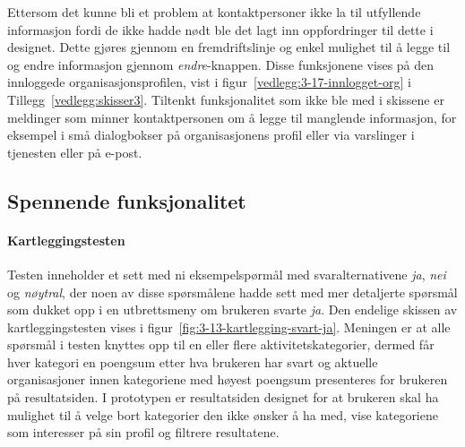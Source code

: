 Ettersom det kunne bli et problem at kontaktpersoner ikke la til utfyllende informasjon fordi de ikke hadde nødt ble det lagt inn oppfordringer til dette i designet. Dette gjøres gjennom en fremdriftslinje og enkel mulighet til å legge til og endre informasjon gjennom {\em endre}-knappen. Disse funksjonene vises på den innloggede organisasjonsprofilen, vist i figur~\ref{vedlegg:3-17-innlogget-org} i Tillegg~\ref{vedlegg:skisser3}. Tiltenkt funksjonalitet som ikke ble med i skissene er meldinger som minner kontaktpersonen om å legge til manglende informasjon, for eksempel i små dialogbokser på organisasjonens profil eller via varslinger i tjenesten eller på e-post.


\subsection{Spennende funksjonalitet}

\paragraph{Kartleggingstesten}
Testen inneholder et sett med ni eksempelspørmål med svaralternativene {\em ja}, {\em nei} og {\em nøytral}, der noen av disse spørsmålene hadde sett med mer detaljerte spørsmål som dukket opp i en utbrettsmeny om brukeren svarte {\em ja}. Den endelige skissen av kartleggingstesten vises i figur~\ref{fig:3-13-kartlegging-svart-ja}. Meningen er at alle spørsmål i testen knyttes opp til en eller flere aktivitetskategorier, dermed får hver kategori en poengsum etter hva brukeren har svart og aktuelle organisasjoner innen kategoriene med høyest poengsum presenteres for brukeren på resultatsiden. I prototypen er resultatsiden designet for at brukeren skal ha mulighet til å velge bort kategorier den ikke ønsker å ha med, vise kategoriene som interesser på sin profil og filtrere resultatene.

